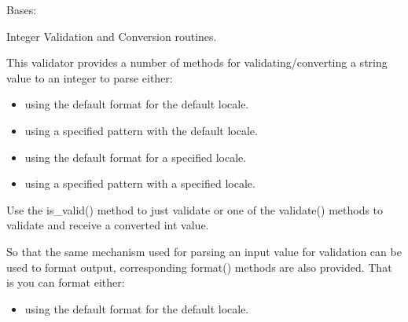 \documentclass[letterpaper,10pt,english]{sphinxmanual}
\begin{document}
\begin{fulllineitems}
\label{\detokenize{apache_commons_validator_python.routines:apache_commons_validator_python.routines.integer_validator.IntegerValidator}}
\pysigstartsignatures
{}
\pysigstopsignatures
\sphinxAtStartPar
Bases: {\hyperref[\detokenize{apache_commons_validator_python.routines:apache_commons_validator_python.routines.abstract_number_validator.AbstractNumberValidator}]{}}

\sphinxAtStartPar
Integer Validation and Conversion routines.

\sphinxAtStartPar
This validator provides a number of methods for validating/converting a string value
to an integer to parse either:
\begin{itemize}
\item {} 
\sphinxAtStartPar
using the default format for the default locale.

\item {} 
\sphinxAtStartPar
using a specified pattern with the default locale.

\item {} 
\sphinxAtStartPar
using the default format for a specified locale.

\item {} 
\sphinxAtStartPar
using a specified pattern with a specified locale.

\end{itemize}

\sphinxAtStartPar
Use the is\_valid() method to just validate or one of the validate() methods to
validate and receive a converted int value.

\sphinxAtStartPar
So that the same mechanism used for parsing an input value for validation can be used to format output,
corresponding format() methods are also provided. That is you can format either:
\begin{itemize}
\item {} 
\sphinxAtStartPar
using the default format for the default locale.


\end{itemize}
\end{fulllineitems}
\end{document}
